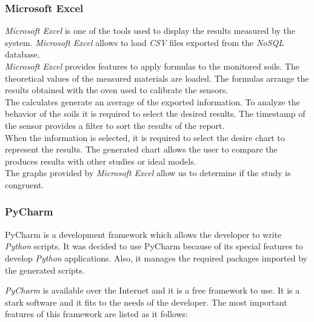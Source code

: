 \subsubsection{Microsoft Excel}

\textit{Microsoft Excel} is one of the tools used to display the results measured by the system. \textit{Microsoft Excel} allows to load \textit{CSV} files exported from the \textit{NoSQL} database.\\

\textit{Microsoft Excel} provides features to apply formulas to the monitored soils. The theoretical values of the measured materials are loaded. The formulas arrange the results obtained with the oven used to calibrate the sensors.\\

The calculates generate an average of the exported information. To analyze the behavior of the soils it is required to select the desired results. The timestamp of the sensor provides a filter to sort the results of the report.\\

When the information is selected, it is required to select the desire chart to represent the results. The generated chart allows the user to compare the produces results with other studies or ideal models.\\

The graphs provided by \textit{Microsoft Excel} allow us to determine if the study is congruent.

\subsubsection{PyCharm}

PyCharm is a development framework which allows the developer to write \textit{Python} scripts. It was decided to use PyCharm because of its special features to develop \textit{Python} applications. Also, it manages the required packages \cite{install_python_modules, pyserial_package, pip} imported by the generated scripts.

\textit{PyCharm} is available over the Internet and it is a free framework to use. It is a stark software and it fits to the needs of the developer. The most important features of this framework are listed as it follows:

